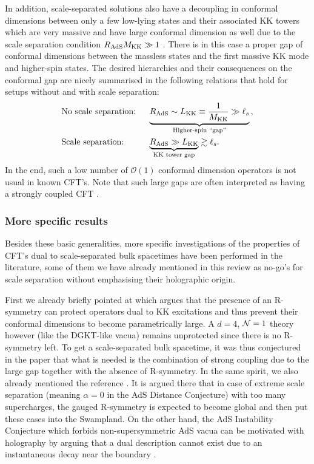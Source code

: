 \documentclass[11pt, a4paper]{article}
\newcommand{\N}{{\cal N}}
\newcommand{\MK}{M_{\rm KK}}
\newcommand{\Rads}{R_{\rm AdS}}
\begin{document}
In addition, scale-separated solutions also have a decoupling in conformal dimensions between only a few low-lying states and their associated KK towers which are very massive and have large conformal dimension as well due to the scale separation condition $\Rads\MK\gg 1$ \cite{Polchinski:2009ch,deAlwis:2014wia,Conlon:2018vov,Conlon:2020wmc}. There is in this case a proper gap of conformal dimensions between the massless states and the first massive KK mode and higher-spin states. The desired hierarchies and their consequences on the conformal gap are nicely summarised in the following relations that hold for setups without and with scale separation:
\begin{equation}
\begin{aligned}
&\text{No scale separation: }&&\underbrace{\Rads\sim L_{\rm KK}\equiv\frac{1}{\MK}\gg\ell_s}_{\text{Higher-spin ``gap''}}\, ,\\
&\text{Scale separation: }&&\underbrace{\Rads\gg L_{\rm KK}}_{\text{KK tower gap}}\gtrsim \ell_s.
\end{aligned}
\end{equation}
%
In the end, such a low number of $\mathcal{O}(1)$ conformal dimension operators is not usual in known CFT's. Note that such large gaps are often interpreted as having a strongly coupled CFT \cite{Polchinski:2009ch}.

\subsubsection{More specific results}

Besides these basic generalities, more specific investigations of the properties of CFT's dual to scale-separated bulk spacetimes have been performed in the literature, some of them we have already mentioned in this review as no-go's for scale separation without emphasising their holographic origin.

First we already briefly pointed at \cite{Polchinski:2009ch} which argues that the presence of an R-symmetry can protect operators dual to KK excitations and thus prevent their conformal dimensions to become parametrically large. A $d=4$, $\N=1$ theory however (like the DGKT-like vacua) remains unprotected since there is no R-symmetry left. To get a scale-separated bulk spacetime, it was thus conjectured in the paper that what is needed is the combination of strong coupling due to the large gap together with the absence of R-symmetry. In the same spirit, we also already mentioned the reference \cite{Montero:2022ghl}. It is argued there that in case of extreme scale separation (meaning $\alpha=0$ in the AdS Distance Conjecture) with too many supercharges, the gauged R-symmetry is expected to become global and then put these cases into the Swampland. On the other hand, the AdS Instability Conjecture which forbids non-supersymmetric AdS vacua can be motivated with holography by arguing that a dual description cannot exist due to an instantaneous decay near the boundary \cite{Horowitz:2007pr,Harlow:2010az,Ooguri:2016pdq}.
\end{document}
